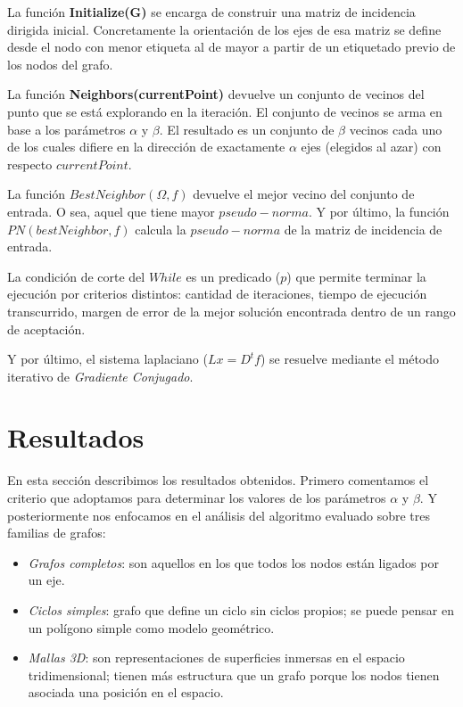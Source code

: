 \documentclass[10pt, a4paper, twocolumn]{article} %
\begin{document}
\newpage

La función \textbf{Initialize(G)} se encarga de construir 
una matriz de incidencia dirigida inicial. Concretamente la orientación 
de los ejes de esa matriz se define desde el nodo con menor 
etiqueta al de mayor a partir de un etiquetado previo de los nodos del 
grafo. 

\smallskip

La función \textbf{Neighbors(currentPoint)} devuelve un conjunto de 
vecinos del punto que se está explorando en la iteración. El conjunto 
de vecinos se arma en base a los parámetros $\alpha$ y $\beta$. El 
resultado es un conjunto de $\beta$ vecinos cada uno de los cuales 
difiere en la dirección de exactamente $\alpha$ ejes (elegidos al azar) 
con respecto $currentPoint$.

\smallskip

La función $BestNeighbor(\Omega,f)$ devuelve el mejor vecino del conjunto 
de entrada. O sea, aquel que tiene mayor $pseudo-norma$. Y por último, 
la función $PN(bestNeighbor,f)$ calcula la $pseudo-norma$ de la matriz 
de incidencia de entrada.

\smallskip

La condición de corte del $While$ es un predicado ($p$) que permite 
terminar la ejecución por criterios distintos: cantidad de iteraciones, 
tiempo de ejecución transcurrido, margen de error de la mejor solución 
encontrada dentro de un rango de aceptación.

\smallskip

Y por último, el sistema laplaciano ($Lx = D^t f$) se resuelve mediante 
el método iterativo de \emph{Gradiente Conjugado}.

\section{Resultados}

En esta sección describimos los resultados obtenidos. Primero 
comentamos el criterio que adoptamos para determinar los valores de los 
parámetros $\alpha$ y $\beta$. Y posteriormente nos enfocamos en el 
análisis del algoritmo evaluado sobre tres familias de grafos: 

\begin{itemize}
	\item \emph{Grafos completos}: son aquellos en los que todos los 
	nodos están ligados por un eje.
	\item \emph{Ciclos simples}: grafo que define un ciclo sin ciclos 
	propios; se puede pensar en un polígono simple como modelo 
	geométrico.
	\item \emph{Mallas 3D}: son representaciones de superficies 
	inmersas en el espacio tridimensional; tienen más estructura que un 
	grafo porque los nodos tienen asociada una posición en el espacio.
\end{itemize}
\end{document}

